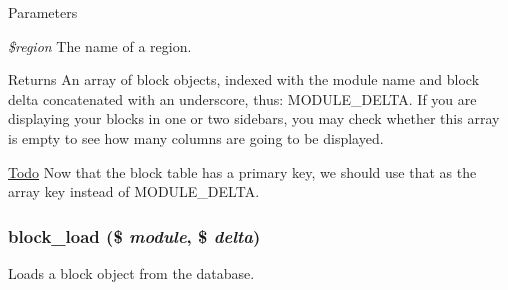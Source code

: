 \begin{DoxyParams}{Parameters}
\item[{\em \$region}]The name of a region.\end{DoxyParams}
\begin{DoxyReturn}{Returns}
An array of block objects, indexed with the module name and block delta concatenated with an underscore, thus: MODULE\_\-DELTA. If you are displaying your blocks in one or two sidebars, you may check whether this array is empty to see how many columns are going to be displayed.
\end{DoxyReturn}
\begin{Desc}
\item[\hyperlink{todo__todo000013}{Todo}]Now that the block table has a primary key, we should use that as the array key instead of MODULE\_\-DELTA. \end{Desc}
\hypertarget{block_8module_a560c20e523332fac0268b48a530ae3e8}{
\subsubsection[{block\_\-load}]{\setlength{\rightskip}{0pt plus 5cm}block\_\-load (\$ {\em module}, \/  \$ {\em delta})}}
\label{block_8module_a560c20e523332fac0268b48a530ae3e8}
Loads a block object from the database.


